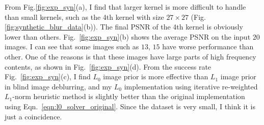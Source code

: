 \documentclass[journal, onecolumn, 10pt]{IEEEtran}
\begin{document}
From Fig.\ref{fig:exp_syn}(a), I find that larger kernel is more difficult to handle than small kernels, such as the 4th kernel with size $27 \times 27$ (Fig.\ref{fig:synthetic_blur_data}(b)). The final PSNR of the 4th kernel is obviously lower than others. Fig.~\ref{fig:exp_syn}(b) shows the average PSNR on the input $20$ images. I can see that some images such as $13$, $15$ have worse performance than other. One of the reasons is that these images have large parts of high frequency contents, as shown in Fig.~\ref{fig:exp_syn}(d). From the success rate Fig.~\ref{fig:exp_syn}(c), I find $L_0$ image prior is more effective than $L_1$ image prior in blind image deblurring, and my $L_0$ implementation using iterative re-weighted $L_1$-norm heuristic method is slightly better than the original implementation using Eqn.~\ref{eqn:l0_solver_original}. Since the dataset is very small, I think it is just a coincidence. 
\end{document}
